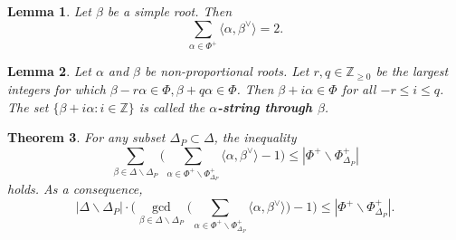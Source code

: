 \documentclass[11pt,a4paper]{amsart}
\newcommand{\Z}{\mathbb{Z}}
\theoremstyle{plain}
\newtheorem{theorem}{Theorem}[section]
\newtheorem{lemma}[theorem]{Lemma}
\theoremstyle{definition}
\theoremstyle{remark}
\begin{document}
\begin{lemma}\label{root sum lemma}
Let $\beta$ be a simple root. Then
\[
\sum_{\alpha\in \Phi^+}\langle \alpha, \beta^\vee \rangle=2.
\]
\end{lemma}

\begin{lemma}\label{lemma:string}
Let $\alpha$ and $\beta$ be non-proportional roots. Let $r, q\in
\Z_{\geq 0}$ be the largest integers for which $\beta-r\alpha\in \Phi,
\beta+q\alpha\in \Phi$. Then $\beta+i\alpha\in \Phi$ for all $-r\leq i\leq
q$. The set $\{\beta+i\alpha : i\in \Z\}$ is called the
\textbf{$\alpha$-string through $\beta$}.
\end{lemma}

\begin{theorem}
For any subset $\Delta_P \subset \Delta$, the inequality
\begin{equation}\label{strong inequality}
\sum_{\beta\in \Delta \smallsetminus \Delta_P}
\Biggl(
\sum_{\alpha\in \Phi^+\smallsetminus \Phi_{\Delta_P}^+}
\langle \alpha,\beta^\vee\rangle-1
\Biggr)
\leq |\Phi^+\smallsetminus \Phi_{\Delta_P}^+|
\end{equation}
holds. As a consequence,
\[
|\Delta \smallsetminus \Delta_P|\cdot
\Biggl(
\gcd_{\beta\in \Delta \smallsetminus \Delta_P}
\Biggl(
\sum_{\alpha\in \Phi^+\smallsetminus \Phi_{\Delta_P}^+}
\langle \alpha,\beta^\vee\rangle
\Biggr)
-1
\Biggr)
\le
|\Phi^+\smallsetminus \Phi_{\Delta_P}^+|.
\]
\end{theorem}
\end{document}
